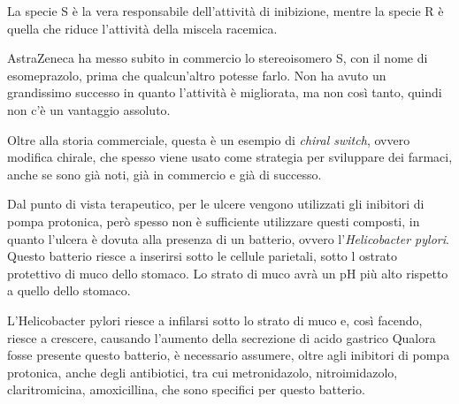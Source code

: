 La specie S è la vera responsabile dell'attività di inibizione, mentre
la specie R è quella che riduce l'attività della miscela racemica.

AstraZeneca ha messo subito in commercio lo stereoisomero S, con il nome
di esomeprazolo, prima che qualcun'altro potesse farlo. Non ha avuto un
grandissimo successo in quanto l'attività è migliorata, ma non così
tanto, quindi non c'è un vantaggio assoluto.


Oltre alla storia commerciale, questa è un esempio di \emph{chiral
switch}, ovvero modifica chirale, che spesso viene usato come strategia
per sviluppare dei farmaci, anche se sono già noti, già in commercio e
già di successo.

Dal punto di vista terapeutico, per le ulcere vengono utilizzati gli
inibitori di pompa protonica, però spesso non è sufficiente utilizzare
questi composti, in quanto l'ulcera è dovuta alla presenza di un
batterio, ovvero l'\emph{Helicobacter pylori}.
Questo batterio riesce a inserirsi sotto le cellule parietali, sotto l
ostrato protettivo di muco dello stomaco. Lo strato di muco avrà un pH
più alto rispetto a quello dello stomaco.

L'Helicobacter pylori riesce a infilarsi sotto lo strato di muco e, così
facendo, riesce a crescere, causando l'aumento della secrezione di
acido gastrico
Qualora fosse presente questo batterio, è necessario assumere, oltre
agli inibitori di pompa protonica, anche degli antibiotici, tra cui
metronidazolo, nitroimidazolo, claritromicina, amoxicillina, che sono
specifici per questo batterio.
